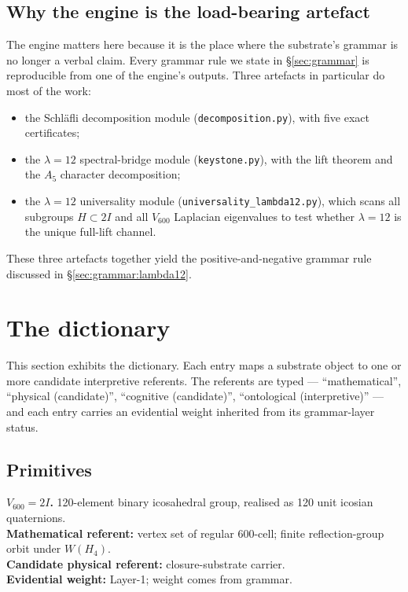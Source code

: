 \documentclass[11pt,a4paper]{article}
\newcommand{\Vsix}{V_{600}}
\begin{document}
\subsection{Why the engine is the load-bearing artefact}

The engine matters here because it is the place where the
substrate's grammar is no longer a verbal claim. Every grammar
rule we state in \S\ref{sec:grammar} is reproducible from one of
the engine's outputs. Three artefacts in particular do most of the
work:

\begin{itemize}[leftmargin=*]
  \item the Schl\"afli decomposition module
        (\texttt{decomposition.py}), with five exact certificates;
  \item the $\lambda = 12$ spectral-bridge module
        (\texttt{keystone.py}), with the lift theorem and the
        $A_5$ character decomposition;
  \item the $\lambda = 12$ universality module
        (\texttt{universality\_lambda12.py}), which scans all
        subgroups $H \subset 2I$ and all $\Vsix$ Laplacian
        eigenvalues to test whether $\lambda = 12$ is the unique
        full-lift channel.
\end{itemize}

These three artefacts together yield the
positive-and-negative grammar rule discussed in
\S\ref{sec:grammar:lambda12}.

\section{The dictionary}
\label{sec:dictionary}

This section exhibits the dictionary. Each entry maps a substrate
object to one or more candidate interpretive referents. The
referents are typed --- ``mathematical'', ``physical (candidate)'',
``cognitive (candidate)'', ``ontological (interpretive)'' --- and
each entry carries an evidential weight inherited from its
grammar-layer status.

\subsection{Primitives}

\begin{dictionarybox}
\textbf{$\Vsix = 2I$.} 120-element binary icosahedral group,
realised as 120 unit icosian quaternions.
\\[0.3em]
\textbf{Mathematical referent:} vertex set of regular $600$-cell;
finite reflection-group orbit under $W(H_4)$.\\
\textbf{Candidate physical referent:} closure-substrate carrier.\\
\textbf{Evidential weight:} Layer-1; weight comes from grammar.
\end{dictionarybox}
\end{document}
